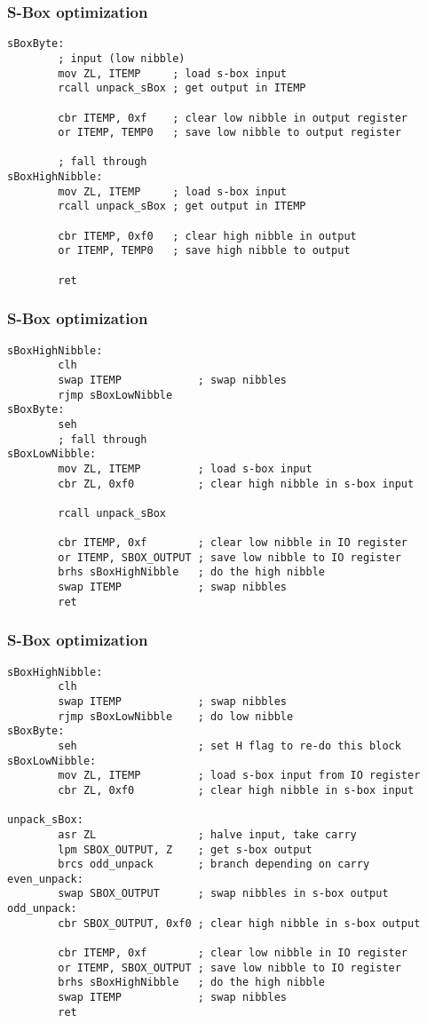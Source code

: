 \documentclass{beamer}
\begin{document}
\begin{frame}[fragile]
\frametitle{S-Box optimization}
\begin{lstlisting}
sBoxByte:
        ; input (low nibble)
        mov ZL, ITEMP     ; load s-box input
        rcall unpack_sBox ; get output in ITEMP

        cbr ITEMP, 0xf    ; clear low nibble in output register
        or ITEMP, TEMP0   ; save low nibble to output register

        ; fall through
sBoxHighNibble:
        mov ZL, ITEMP     ; load s-box input
        rcall unpack_sBox ; get output in ITEMP

        cbr ITEMP, 0xf0   ; clear high nibble in output
        or ITEMP, TEMP0   ; save high nibble to output

        ret
\end{lstlisting}
\end{frame}

\begin{frame}[fragile]
\frametitle{S-Box optimization}
\begin{lstlisting}
sBoxHighNibble:
        clh
        swap ITEMP            ; swap nibbles
        rjmp sBoxLowNibble
sBoxByte:
        seh
        ; fall through
sBoxLowNibble:
        mov ZL, ITEMP         ; load s-box input
        cbr ZL, 0xf0          ; clear high nibble in s-box input

        rcall unpack_sBox

        cbr ITEMP, 0xf        ; clear low nibble in IO register
        or ITEMP, SBOX_OUTPUT ; save low nibble to IO register
        brhs sBoxHighNibble   ; do the high nibble
        swap ITEMP            ; swap nibbles
        ret
\end{lstlisting}
\end{frame}

\begin{frame}[fragile]
\frametitle{S-Box optimization}
\begin{lstlisting}
sBoxHighNibble:
        clh
        swap ITEMP            ; swap nibbles
        rjmp sBoxLowNibble    ; do low nibble
sBoxByte:
        seh                   ; set H flag to re-do this block
sBoxLowNibble:
        mov ZL, ITEMP         ; load s-box input from IO register
        cbr ZL, 0xf0          ; clear high nibble in s-box input

unpack_sBox:
        asr ZL                ; halve input, take carry
        lpm SBOX_OUTPUT, Z    ; get s-box output
        brcs odd_unpack       ; branch depending on carry
even_unpack:
        swap SBOX_OUTPUT      ; swap nibbles in s-box output
odd_unpack:
        cbr SBOX_OUTPUT, 0xf0 ; clear high nibble in s-box output

        cbr ITEMP, 0xf        ; clear low nibble in IO register
        or ITEMP, SBOX_OUTPUT ; save low nibble to IO register
        brhs sBoxHighNibble   ; do the high nibble
        swap ITEMP            ; swap nibbles
        ret
\end{lstlisting}
\end{frame}
\end{document}
